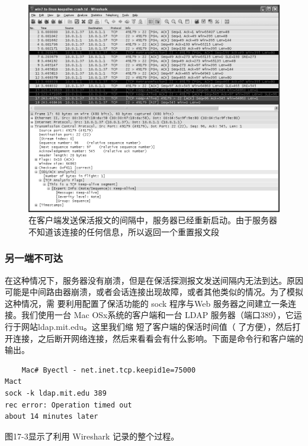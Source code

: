 \begin{figure}[!htb]
    \centering
	\includegraphics[width=1\textwidth]{imgs/17/17-2.png}
	\caption{在客户端发送保活报文的间隔中，服务器已经重新启动。由于服务器不知道该连接的任何信息，所以返回一个重置报文段}
\end{figure}

\subsubsection{另一端不可达}
在这种情况下，服务器没有崩溃，但是在保活探测报文发送间隔内无法到达。原因可能是中间路由器崩溃，或者会话连接出现故障，或者其他类似的情况。为了模拟这种情况，需
要利用配置了保活功能的 sock 程序与Web 服务器之间建立一条连接。我们使用一台 Mac OSx系统的客户端和一台 LDAP 服务器（端口389），它运行于网站ldap.mit.edu。这里我们缩
短了客户端的保活时间值（ 了方便），然后打开连接，之后断开网络连接，然后来看看会有什么影响。下面是命令行和客户端的输出。

\begin{verbatim}
    Mac# Byectl - net.inet.tcp.keepid1e=75000
Mact
sock -k ldap.mit.edu 389
rec error: Operation timed out
about 14 minutes later
\end{verbatim}

图17-3显示了利用 Wireshark 记录的整个过程。

